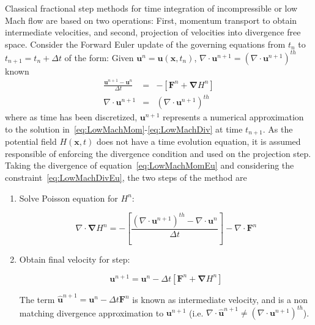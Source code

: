Classical fractional step methods for time integration of incompressible or low Mach flow are based on two operations: First, momentum transport to obtain intermediate velocities, and second, projection of velocities into divergence free space. Consider the Forward Euler update of the governing equations from $t_n$ to $t_{n+1}=t_n + \Delta t$ of the form: Given $ \mathbf{u}^n=\mathbf{u}(\mathbf{x},t_n)$, $\nabla \cdot \mathbf{u}^{n+1} = \left( \nabla \cdot \mathbf{u}^{n+1} \right)^{th}$ known
%
\begin{eqnarray}
  \frac{\mathbf{u}^{n+1}-\mathbf{u}^{n}}{\Delta t} &=& - \left[ \mathbf{F}^n +  \boldsymbol{\nabla} H^n \right] \label{eq:LowMachMomEu}\\
  \nabla \cdot \mathbf{u}^{n+1} &=& \left( \nabla \cdot \mathbf{u}^{n+1} \right)^{th} \label{eq:LowMachDivEu}
\end{eqnarray}
%
where as time has been discretized, $\mathbf{u}^{n+1}$ represents a numerical approximation to the solution in~\eqref{eq:LowMachMom}-\eqref{eq:LowMachDiv} at time $t_{n+1}$. As the potential field $H(\mathbf{x},t)$ does not have a time evolution equation, it is assumed responsible of enforcing the divergence condition and used on the projection step. Taking the divergence of equation~\eqref{eq:LowMachMomEu} and considering  the constraint~\eqref{eq:LowMachDivEu}, the two steps of the method are
%
\begin{enumerate}
  \item Solve Poisson equation for $H^n$:

\begin{equation}
   \nabla \cdot \boldsymbol{\nabla} H^n = - \left[ \frac{\left( \nabla \cdot \mathbf{u}^{n+1} \right)^{th} - \nabla \cdot \mathbf{u}^{n}}{\Delta t} \right] - \nabla \cdot \mathbf{F}^n \label{it:FSPoisson}
\end{equation}

  \item Obtain final velocity for step:

  \begin{equation}
     \mathbf{u}^{n+1} = \mathbf{u}^{n} - \Delta t \left[ \mathbf{F}^n +  \boldsymbol{\nabla} H^n \right] \label{it:FSProject}
   \end{equation}

   The term $\hat{\mathbf{u}}^{n+1}=\mathbf{u}^{n} - \Delta t \mathbf{F}^n$ is known as intermediate velocity, and is a non matching divergence approximation to $\mathbf{u}^{n+1}$ (i.e. $\nabla \cdot \hat{\mathbf{u}}^{n+1} \neq \left( \nabla \cdot \mathbf{u}^{n+1} \right)^{th}$).
\end{enumerate}
